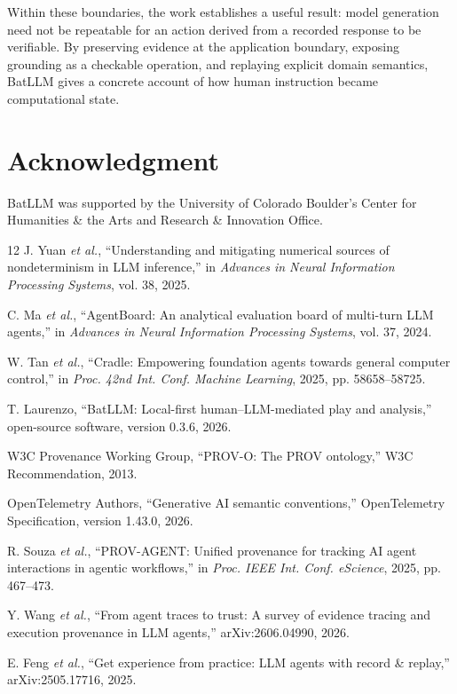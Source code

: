 \documentclass[conference,a4paper]{IEEEtran}
\begin{document}
Within these boundaries, the work establishes a useful result: model generation need not be repeatable for an action derived from a recorded response to be verifiable. By preserving evidence at the application boundary, exposing grounding as a checkable operation, and replaying explicit domain semantics, BatLLM gives a concrete account of how human instruction became computational state.

\section*{Acknowledgment}
BatLLM was supported by the University of Colorado Boulder's Center for Humanities \& the Arts and Research \& Innovation Office.

\flushend
\begin{thebibliography}{12}
J. Yuan \emph{et al.}, ``Understanding and mitigating numerical sources of nondeterminism in LLM inference,'' in \emph{Advances in Neural Information Processing Systems}, vol. 38, 2025.

C. Ma \emph{et al.}, ``AgentBoard: An analytical evaluation board of multi-turn LLM agents,'' in \emph{Advances in Neural Information Processing Systems}, vol. 37, 2024.

W. Tan \emph{et al.}, ``Cradle: Empowering foundation agents towards general computer control,'' in \emph{Proc. 42nd Int. Conf. Machine Learning}, 2025, pp. 58658--58725.

T. Laurenzo, ``BatLLM: Local-first human--LLM-mediated play and analysis,'' open-source software, version 0.3.6, 2026.

W3C Provenance Working Group, ``PROV-O: The PROV ontology,'' W3C Recommendation, 2013.

OpenTelemetry Authors, ``Generative AI semantic conventions,'' OpenTelemetry Specification, version 1.43.0, 2026.

R. Souza \emph{et al.}, ``PROV-AGENT: Unified provenance for tracking AI agent interactions in agentic workflows,'' in \emph{Proc. IEEE Int. Conf. eScience}, 2025, pp. 467--473.

Y. Wang \emph{et al.}, ``From agent traces to trust: A survey of evidence tracing and execution provenance in LLM agents,'' arXiv:2606.04990, 2026.

E. Feng \emph{et al.}, ``Get experience from practice: LLM agents with record \& replay,'' arXiv:2505.17716, 2025.


\end{thebibliography}
\end{document}
